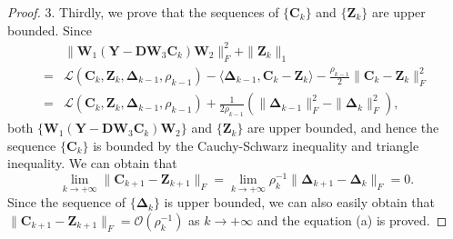 \begin{proof}
3. Thirdly, we prove that the sequences of 
$\{\bm{C}_{k}\}$ and $\{\bm{Z}_{k}\}$ are upper bounded. Since 
\begin{align}
&\|\bm{W}_{1}(\bm{Y}-\bm{D}\bm{W}_{3}\bm{C}_{k})\bm{W}_{2}\|_{F}^{2}
+
\|\bm{Z}_{k}\|_{1}
\\
=
&
\mathcal{L}(\bm{C}_{k},\bm{Z}_{k},\bm{\Delta}_{k-1},\rho_{k-1})
-
\langle
\bm{\Delta}_{k-1},
\bm{C}_{k}-\bm{Z}_{k}
\rangle
-
\frac{\rho_{k-1}}{2}
\|
\bm{C}_{k}-\bm{Z}_{k}
\|_{F}^{2}
\\
=
&
\mathcal{L}(\bm{C}_{k},\bm{Z}_{k},\bm{\Delta}_{k-1},\rho_{k-1})
+
\frac{1}{2\rho_{k-1}}
(
\|
\bm{\Delta}_{k-1}
\|_{F}^{2}
-
\|
\bm{\Delta}_{k}
\|_{F}^{2}
)
,
\end{align}
both $\{\bm{W}_{1}(\bm{Y}-\bm{D}\bm{W}_{3}\bm{C}_{k})\bm{W}_{2}\}$ and $\{\bm{Z}_{k}\}$ are upper bounded, and hence
the sequence $\{\bm{C}_{k}\}$ is bounded by the Cauchy-Schwarz inequality and triangle inequality.
We can obtain that 
\begin{equation}
\lim_{k \to +\infty} 
\|\bm{C}_{k+1}-\bm{Z}_{k+1}\|_{F}
=
\lim_{k \to +\infty} 
\rho_{k}^{-1}
\|
\bm{\Delta}_{k+1}
-
\bm{\Delta}_{k}
\|_{F}
=
0.
\end{equation}
Since the sequence of $\{\bm{\Delta}_{k}\}$ is upper bounded, we can also easily obtain that
$\|\bm{C}_{k+1}-\bm{Z}_{k+1}\|_{F}=\mathcal{O}(\rho_{k}^{-1})$ 
as 
$k \to +\infty$
and the equation (a) is proved.


\end{proof}
